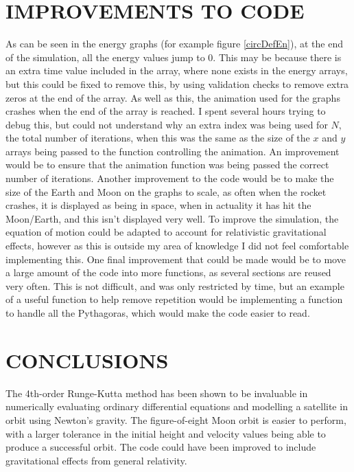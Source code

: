 \documentclass[twocolumn,prl,nobalancelastpage,aps,10pt]{revtex4-1}
\begin{document}
\section{IMPROVEMENTS TO CODE}

As can be seen in the energy graphs (for example figure \ref{circDefEn}), at the end of the simulation, all the energy values jump to 0. This may be because there is an extra time value included in the array, where none exists in the energy arrays, but this could be fixed to remove this, by using validation checks to remove extra zeros at the end of the array. As well as this, the animation used for the graphs crashes when the end of the array is reached. I spent several hours trying to debug this, but could not understand why an extra index was being used for $N$, the total number of iterations, when this was the same as the size of the $x$ and $y$ arrays being passed to the function controlling the animation. An improvement would be to ensure that the animation function was being passed the correct number of iterations. Another improvement to the code would be to make the size of the Earth and Moon on the graphs to scale, as often when the rocket crashes, it is displayed as being in space, when in actuality it has hit the Moon/Earth, and this isn't displayed very well. To improve the simulation, the equation of motion could be adapted to account for relativistic gravitational effects, however as this is outside my area of knowledge I did not feel comfortable implementing this. One final improvement that could be made would be to move a large amount of the code into more functions, as several sections are reused very often. This is not difficult, and was only restricted by time, but an example of a useful function to help remove repetition would be implementing a function to handle all the Pythagoras, which would make the code easier to read.


\section{CONCLUSIONS}

The 4th-order Runge-Kutta method has been shown to be invaluable in numerically evaluating ordinary differential equations and modelling a satellite in orbit using Newton's gravity. The figure-of-eight Moon orbit is easier to perform, with a larger tolerance in the initial height and velocity values being able to produce a successful orbit. The code could have been improved to include gravitational effects from general relativity.
\end{document}
